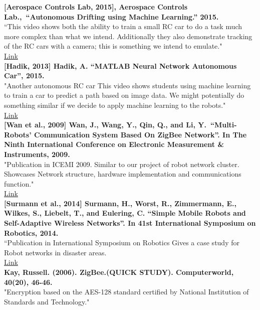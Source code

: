 \documentclass[a4paper]{article}
\begin{document}
	\textbf{[Aerospace Controls Lab, 2015], Aerospace Controls Lab., “Autonomous Drifting using Machine Learning.” 2015.}\\
	“This video shows both the ability to train a small RC car to do a task much more complex than what we intend. Additionally they also demonstrate tracking of the RC cars with a camera; this is something we intend to emulate." \\
	\href{https://www.youtube.com/watch?v=opsmd5yuBF0}{Link}\\
		
	\textbf{[Hadik, 2013] Hadik, A. “MATLAB Neural Network Autonomous Car”, 2015.}\\
	"Another autonomous RC car This video shows students using machine learning to train a car to predict a path based on image data. We might potentially do something similar if we decide to apply machine learning to the robots."\\
	\href{https://www.youtube.com/watch?v=mW6Y\_tiiNYM}{Link}\\
		
	\textbf{[Wan et al., 2009] Wan, J., Wang, Y., Qin, Q., and Li, Y. “Multi-Robots’ Communication System Based On ZigBee Network”. In The Ninth International Conference on Electronic Measurement \& Instruments, 2009.}\\
	"Publication in ICEMI 2009. Similar to our project of robot network cluster. Showcases Network structure, hardware implementation and communications function."\\ \href{http://ieeexplore.ieee.org.uml.idm.oclc.org/document/5274350/}{Link}\\
		
	\textbf{[Surmann et al., 2014] Surmann, H., Worst, R., Zimmermann, E., Wilkes, S., Liebelt, T., and Eulering, C. “Simple Mobile Robots and Self-Adaptive Wireless Networks”. In 41st International Symposium on Robotics, 2014.}\\
	“Publication in International Symposium on Robotics Gives a case study for Robot networks in disaster areas.\\ 
	\href{http://ieeexplore.ieee.org.uml.idm.oclc.org/document/6840176/}{Link}\\
	
	\textbf{Kay, Russell. (2006). ZigBee.(QUICK STUDY). Computerworld, 40(20), 46-46.}\\
	"Encryption based on the AES-128 standard certified by National Institution of Standards and
	Technology."\\
	
\end{document}
